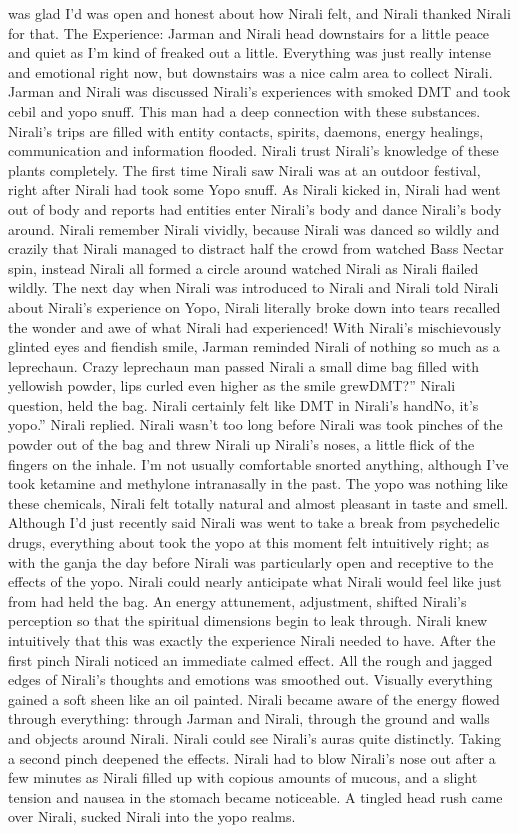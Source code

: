 \documentclass[12pt]{book}
\begin{document}
was glad I'd was open and honest about how Nirali felt, and Nirali thanked Nirali for that. The Experience: Jarman and Nirali head downstairs for a little peace and quiet as I'm kind of freaked out a little. Everything was just really intense and emotional right now, but downstairs was a nice calm area to collect Nirali. Jarman and Nirali was discussed Nirali's experiences with smoked DMT and took cebil and yopo snuff. This man had a deep connection with these substances. Nirali's trips are filled with entity contacts, spirits, daemons, energy healings, communication and information flooded. Nirali trust Nirali's knowledge of these plants completely. The first time Nirali saw Nirali was at an outdoor festival, right after Nirali had took some Yopo snuff. As Nirali kicked in, Nirali had went out of body and reports had entities enter Nirali's body and dance Nirali's body around. Nirali remember Nirali vividly, because Nirali was danced so wildly and crazily that Nirali managed to distract half the crowd from watched Bass Nectar spin, instead Nirali all formed a circle around watched Nirali as Nirali flailed wildly. The next day when Nirali was introduced to Nirali and Nirali told Nirali about Nirali's experience on Yopo, Nirali literally broke down into tears recalled the wonder and awe of what Nirali had experienced! With Nirali's mischievously glinted eyes and fiendish smile, Jarman reminded Nirali of nothing so much as a leprechaun. Crazy leprechaun man passed Nirali a small dime bag filled with yellowish powder, lips curled even higher as the smile grewDMT?'' Nirali question, held the bag. Nirali certainly felt like DMT in Nirali's handNo, it's yopo.'' Nirali replied. Nirali wasn't too long before Nirali was took pinches of the powder out of the bag and threw Nirali up Nirali's noses, a little flick of the fingers on the inhale. I'm not usually comfortable snorted anything, although I've took ketamine and methylone intranasally in the past. The yopo was nothing like these chemicals, Nirali felt totally natural and almost pleasant in taste and smell. Although I'd just recently said Nirali was went to take a break from psychedelic drugs, everything about took the yopo at this moment felt intuitively right; as with the ganja the day before Nirali was particularly open and receptive to the effects of the yopo. Nirali could nearly anticipate what Nirali would feel like just from had held the bag. An energy attunement, adjustment, shifted Nirali's perception so that the spiritual dimensions begin to leak through. Nirali knew intuitively that this was exactly the experience Nirali needed to have. After the first pinch Nirali noticed an immediate calmed effect. All the rough and jagged edges of Nirali's thoughts and emotions was smoothed out. Visually everything gained a soft sheen like an oil painted. Nirali became aware of the energy flowed through everything: through Jarman and Nirali, through the ground and walls and objects around Nirali. Nirali could see Nirali's auras quite distinctly. Taking a second pinch deepened the effects. Nirali had to blow Nirali's nose out after a few minutes as Nirali filled up with copious amounts of mucous, and a slight tension and nausea in the stomach became noticeable. A tingled head rush came over Nirali, sucked Nirali into the yopo realms. 
\end{document}
